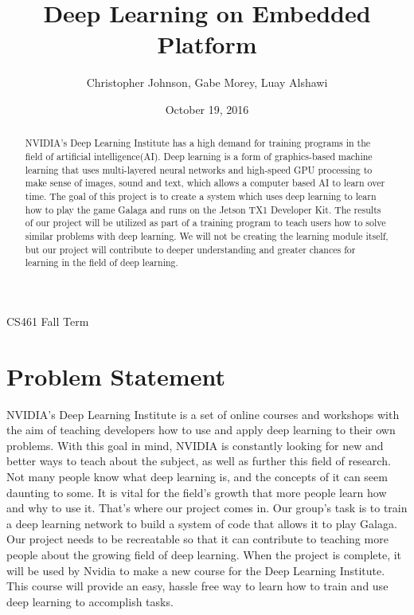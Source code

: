\documentclass[letterpaper,10pt]{article}
\author{Christopher Johnson, Gabe Morey, Luay Alshawi}
\title{Deep Learning on Embedded Platform}
\date{October 19, 2016}
\begin{document}
\begin{titlingpage}
\maketitle
CS461 Fall Term
\begin{abstract}
NVIDIA's Deep Learning Institute has a high demand for training programs in the field of artificial intelligence(AI).
Deep learning is a form of graphics-based machine learning that uses multi-layered neural networks and high-speed GPU processing to make sense of images, sound and text, which allows a computer based AI to learn over time.
The goal of this project is to create a system which uses deep learning to learn how to play the game Galaga and runs on the Jetson TX1 Developer Kit.
The results of our project will be utilized as part of a training program to teach users how to solve similar problems with deep learning.
We will not be creating the learning module itself, but our project will contribute to deeper understanding and greater chances for learning in the field of deep learning.
\end{abstract}
\end{titlingpage}

\section{Problem Statement}
NVIDIA’s Deep Learning Institute is a set of online courses and workshops with the aim of teaching developers how to use and apply deep learning to their own problems.
With this goal in mind, NVIDIA is constantly looking for new and better ways to teach about the subject, as well as further this field of research.
Not many people know what deep learning is, and the concepts of it can seem daunting to some.
It is vital for the field's growth that more people learn how and why to use it.
That's where our project comes in.
Our group’s task is to train a deep learning network to build a system of code that allows it to play Galaga.
Our project needs to be recreatable so that it can contribute to teaching more people about the growing field of deep learning.
When the project is complete, it will be used by Nvidia to make a new course for the Deep Learning Institute.
This course will provide an easy, hassle free way to learn how to train and use deep learning to accomplish tasks.
\end{document}
